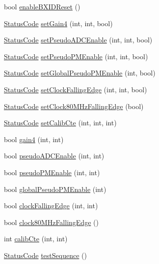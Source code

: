 \begin{DoxyCompactItemize}
\item 
bool \hyperlink{classFEB__v1_ac8186be2d5fd8122092d6475e77395e9}{enable\+B\+X\+I\+D\+Reset} ()
\item 
\hyperlink{classStatusCode}{Status\+Code} \hyperlink{classFEB__v1_ac30cac86837c86e4f03cb51fff6226cd}{set\+Gain4} (int, int, bool)
\item 
\hyperlink{classStatusCode}{Status\+Code} \hyperlink{classFEB__v1_a244c472d16ea6778cf6ec93943a060a5}{set\+Pseudo\+A\+D\+C\+Enable} (int, int, bool)
\item 
\hyperlink{classStatusCode}{Status\+Code} \hyperlink{classFEB__v1_af422c3cf889440d5d49cce51d98b496e}{set\+Pseudo\+P\+M\+Enable} (int, int, bool)
\item 
\hyperlink{classStatusCode}{Status\+Code} \hyperlink{classFEB__v1_adce2d9c70235f4226ab59aea3dc5953c}{set\+Global\+Pseudo\+P\+M\+Enable} (int, bool)
\item 
\hyperlink{classStatusCode}{Status\+Code} \hyperlink{classFEB__v1_af2bb7bacef6c06d15e2c9e47c373de08}{set\+Clock\+Falling\+Edge} (int, int, bool)
\item 
\hyperlink{classStatusCode}{Status\+Code} \hyperlink{classFEB__v1_a9ccd318b9a80b1cbd554ec6fe461cd82}{set\+Clock80\+M\+Hz\+Falling\+Edge} (bool)
\item 
\hyperlink{classStatusCode}{Status\+Code} \hyperlink{classFEB__v1_acf3c8ad478ce506bb9d9cb3e4d3b6252}{set\+Calib\+Cte} (int, int, int)
\item 
bool \hyperlink{classFEB__v1_a6b05c21a70fbb2e88f8e1f991a117b49}{gain4} (int, int)
\item 
bool \hyperlink{classFEB__v1_aeb6c988faf48d93637ef669c54e25223}{pseudo\+A\+D\+C\+Enable} (int, int)
\item 
bool \hyperlink{classFEB__v1_ab6b076d6e1372bfa8d9fd2916b1b52cd}{pseudo\+P\+M\+Enable} (int, int)
\item 
bool \hyperlink{classFEB__v1_acfaf998ce0166362401e5253502a16d2}{global\+Pseudo\+P\+M\+Enable} (int)
\item 
bool \hyperlink{classFEB__v1_aa9f591714dce594562e3e959b105a580}{clock\+Falling\+Edge} (int, int)
\item 
bool \hyperlink{classFEB__v1_a8518757e40b372f784674da1a2c41091}{clock80\+M\+Hz\+Falling\+Edge} ()
\item 
int \hyperlink{classFEB__v1_ad3893c8062c75d1f9695c196c95703c7}{calib\+Cte} (int, int)
\item 
\hyperlink{classStatusCode}{Status\+Code} \hyperlink{classFEB__v1_a7b948b40f3034ccfb0a696b5cf9c5c6c}{test\+Sequence} ()

\end{DoxyCompactItemize}
